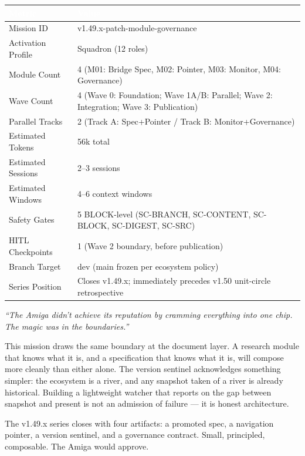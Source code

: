 \documentclass[11pt,letterpaper]{article}
\newcommand{\tableheader}[1]{\textbf{\sffamily\textcolor{white}{#1}}}
\begin{document}
\begin{center}
\begin{tabularx}{\textwidth}{L{4.5cm}X}
\toprule
{}
\tableheader{Metric} & \tableheader{Value} \\
\midrule
Mission ID & v1.49.x-patch-module-governance \\
Activation Profile & Squadron (12 roles) \\
Module Count & 4 (M01: Bridge Spec, M02: Pointer, M03: Monitor, M04: Governance) \\
Wave Count & 4 (Wave 0: Foundation; Wave 1A/B: Parallel; Wave 2: Integration; Wave 3: Publication) \\
Parallel Tracks & 2 (Track A: Spec+Pointer / Track B: Monitor+Governance) \\
Estimated Tokens & 56k total \\
Estimated Sessions & 2--3 sessions \\
Estimated Windows & 4--6 context windows \\
Safety Gates & 5 BLOCK-level (SC-BRANCH, SC-CONTENT, SC-BLOCK, SC-DIGEST, SC-SRC) \\
HITL Checkpoints & 1 (Wave 2 boundary, before publication) \\
Branch Target & dev (main frozen per ecosystem policy) \\
Series Position & Closes v1.49.x; immediately precedes v1.50 unit-circle retrospective \\
\bottomrule
\end{tabularx}
\end{center}

\begin{quotebox}
\textit{``The Amiga didn't achieve its reputation by cramming everything into one chip. The magic was in the boundaries.''}

\medskip
\noindent This mission draws the same boundary at the document layer. A research module that knows what it is, and a specification that knows what it is, will compose more cleanly than either alone. The version sentinel acknowledges something simpler: the ecosystem is a river, and any snapshot taken of a river is already historical. Building a lightweight watcher that reports on the gap between snapshot and present is not an admission of failure --- it is honest architecture.

\medskip
\noindent The v1.49.x series closes with four artifacts: a promoted spec, a navigation pointer, a version sentinel, and a governance contract. Small, principled, composable. The Amiga would approve.
\end{quotebox}
\end{document}
